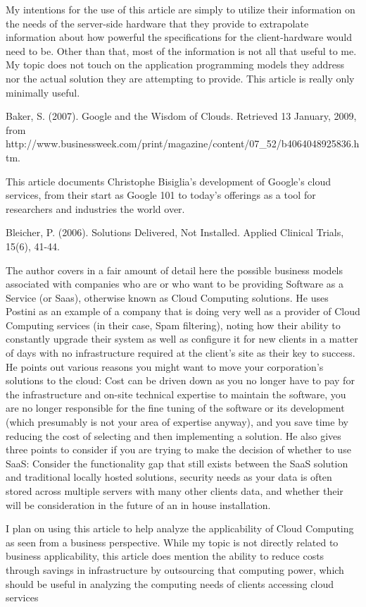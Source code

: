 \documentclass[12pt,oneside,letterpaper,titlepage]{article}
\begin{document}
My intentions for the use of this article are simply to utilize their
information on the needs of the server-side hardware that they provide to
extrapolate information about how powerful the specifications for the
client-hardware would need to be. Other than that, most of the information is
not all that useful to me. My topic does not touch on the application
programming models they address nor the actual solution they are attempting to
provide. This article is really only minimally useful.

Baker, S. (2007). Google and the Wisdom of Clouds. Retrieved 13 January, 2009, from http://www.businessweek.com/print/magazine/content/07_52/b4064048925836.htm.

This article documents Christophe Bisiglia's development of Google's cloud
services, from their start as Google 101 to today's offerings as a tool for
researchers and industries the world over.

Bleicher, P. (2006). Solutions Delivered, Not Installed. Applied Clinical Trials, 15(6), 41-44.

The author covers in a fair amount of detail here the possible business models
associated with companies who are or who want to be providing Software as a
Service (or Saas), otherwise known as Cloud Computing solutions. He uses Postini
as an example of a company that is doing very well as a provider of Cloud
Computing services (in their case, Spam filtering), noting how their ability to
constantly upgrade their system as well as configure it for new clients in a
matter of days with no infrastructure required at the client's site as their key
to success. He points out various reasons you might want to move your
corporation's solutions to the cloud: Cost can be driven down as you no longer
have to pay for the infrastructure and on-site technical expertise to maintain
the software, you are no longer responsible for the fine tuning of the software
or its development (which presumably is not your area of expertise anyway), and
you save time by reducing the cost of selecting and then implementing a
solution. He also gives three points to consider if you are trying to make the
decision of whether to use SaaS: Consider the functionality gap that still
exists between the SaaS solution and traditional locally hosted solutions,
security needs as your data is often stored across multiple servers with many
other clients data, and whether their will be consideration in the future of an
in house installation.

I plan on using this article to help analyze the applicability of Cloud
Computing as seen from a business perspective. While my topic is not directly
related to business applicability, this article does mention the ability to
reduce costs through savings in infrastructure by outsourcing that computing
power, which should be useful in analyzing the computing needs of clients
accessing cloud services
\end{document}
